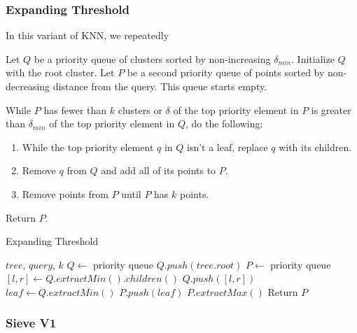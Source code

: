 \subsubsection{Expanding Threshold}
\label{subsubsec:methods:knn-search:expanding-threshold}
In this variant of KNN, we repeatedly  

Let $Q$ be a priority queue of clusters sorted by non-increasing $\delta_{min}$. Initialize $Q$ with the root cluster.
Let $P$ be a second priority queue of points sorted by non-decreasing distance from the query. This queue starts empty.

While $P$ has fewer than $k$ clusters or $\delta$ of the top priority element in $P$ is greater 
than $\delta_{min}$ of the top priority element in $Q$, do the following:
\begin{enumerate}
\item While the top priority element $q$ in $Q$ isn't a leaf, replace $q$ with its children.
\item Remove $q$ from $Q$ and add all of its points to $P$. 
\item Remove points from $P$ until $P$ has $k$ points. 
\end{enumerate}

Return $P$. 


\begin{algorithm} %
\caption{Expanding Threshold} %
\label{alg:expanding_threshold} %
\begin{algorithmic}[1] %
    \REQUIRE $tree$, $query$, $k$
    \STATE $Q \leftarrow$ priority queue
    \STATE $Q.push(tree.root)$
    \STATE $P \leftarrow$ priority queue
            \STATE $[l, r] \leftarrow Q.extractMin().children()$
            \STATE $Q.push([l, r])$
        \ENDWHILE
        \STATE $leaf \leftarrow Q.extractMin()$
        \STATE $P.push(leaf)$
            \STATE $P.extractMax()$
        \ENDWHILE
    \ENDWHILE
    \STATE Return $P$
\end{algorithmic}
\end{algorithm}


\subsubsection{Sieve V1}
\label{subsubsec:methods:knn-search:sieve-v1}

